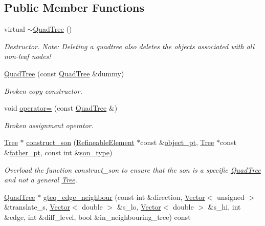 \subsection*{Public Member Functions}
\begin{DoxyCompactItemize}
\item 
virtual \hyperlink{classoomph_1_1QuadTree_ab6dd217086350735063424dc6f7a02fb}{$\sim$\+Quad\+Tree} ()
\begin{DoxyCompactList}\small\item\em Destructor. Note\+: Deleting a quadtree also deletes the objects associated with all non-\/leaf nodes! \end{DoxyCompactList}\item 
\hyperlink{classoomph_1_1QuadTree_a6eaeaee810370ab90cec37e70d9cdaa3}{Quad\+Tree} (const \hyperlink{classoomph_1_1QuadTree}{Quad\+Tree} \&dummy)
\begin{DoxyCompactList}\small\item\em Broken copy constructor. \end{DoxyCompactList}\item 
void \hyperlink{classoomph_1_1QuadTree_a5aa0ce0775cb4295ccdd6e7a20c80e11}{operator=} (const \hyperlink{classoomph_1_1QuadTree}{Quad\+Tree} \&)
\begin{DoxyCompactList}\small\item\em Broken assignment operator. \end{DoxyCompactList}\item 
\hyperlink{classoomph_1_1Tree}{Tree} $\ast$ \hyperlink{classoomph_1_1QuadTree_aa05756df125b508ca55f30cf4c4a11e9}{construct\+\_\+son} (\hyperlink{classoomph_1_1RefineableElement}{Refineable\+Element} $\ast$const \&\hyperlink{classoomph_1_1Tree_a2f2eeb0f1dd161f696cccc652974ff4c}{object\+\_\+pt}, \hyperlink{classoomph_1_1Tree}{Tree} $\ast$const \&\hyperlink{classoomph_1_1Tree_a5f8444ddeda272b70669b8bbe929708a}{father\+\_\+pt}, const int \&\hyperlink{classoomph_1_1Tree_a7537f8fe7c896d2220eb2da03567b34d}{son\+\_\+type})
\begin{DoxyCompactList}\small\item\em Overload the function construct\+\_\+son to ensure that the son is a specific \hyperlink{classoomph_1_1QuadTree}{Quad\+Tree} and not a general \hyperlink{classoomph_1_1Tree}{Tree}. \end{DoxyCompactList}\item 
\hyperlink{classoomph_1_1QuadTree}{Quad\+Tree} $\ast$ \hyperlink{classoomph_1_1QuadTree_ab8cf08ddd68ec671c111bc55f9b37e70}{gteq\+\_\+edge\+\_\+neighbour} (const int \&direction, \hyperlink{classoomph_1_1Vector}{Vector}$<$ unsigned $>$ \&translate\+\_\+s, \hyperlink{classoomph_1_1Vector}{Vector}$<$ double $>$ \&s\+\_\+lo, \hyperlink{classoomph_1_1Vector}{Vector}$<$ double $>$ \&s\+\_\+hi, int \&edge, int \&diff\+\_\+level, bool \&in\+\_\+neighbouring\+\_\+tree) const

\end{DoxyCompactItemize}
